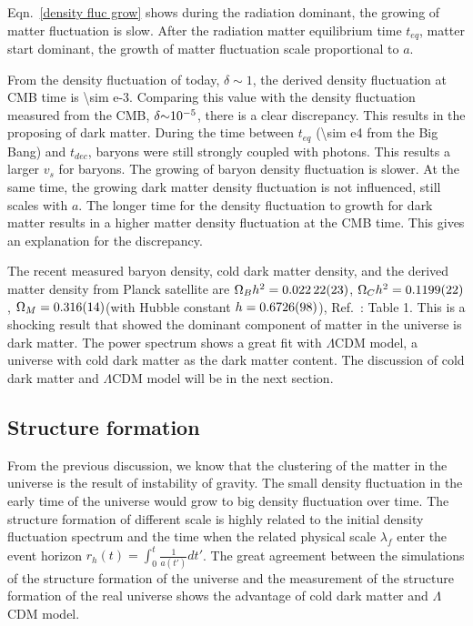 Eqn.~\ref{density fluc grow} shows during the radiation dominant, the growing of matter fluctuation is slow. After the radiation matter equilibrium time $t_{eq}$, matter start dominant, the growth of matter fluctuation scale proportional to $a$. 

From the density fluctuation of today, $\delta \sim 1$, the derived density fluctuation at CMB time is \num{\sim e-3}. Comparing this value with the density fluctuation measured from the CMB, $\delta \num{\sim e-5}$, there is a clear discrepancy. This results in the proposing of dark matter. During the time between $t_{eq}$ (\SI{\sim e4}{\yr} from the Big Bang) and $t_{dec}$, baryons were still strongly coupled with photons. This results a larger $v_s$ for baryons. The growing of baryon density fluctuation is slower. At the same time, the growing dark matter density fluctuation is not influenced, still scales with $a$. The longer time for the density fluctuation to growth for dark matter results in a higher matter density fluctuation at the CMB time. This gives an explanation for the discrepancy. 

The recent measured baryon density, cold dark matter density, and the derived matter density from Planck satellite are $\Omega_B h^2= \num[separate-uncertainty=false]{0.02222 \pm 0.00023}$, $\Omega_C h^2 = \num[separate-uncertainty=false]{0.1199 \pm 0.0022}$, $\Omega_M = \num[separate-uncertainty=false]{0.316 \pm 0.014}$(with Hubble constant $h = \num[separate-uncertainty=false]{0.6726 \pm 0.0098}$), Ref.~\cite{Ade2016}: Table 1. This is a shocking result that showed the dominant component of matter in the universe is dark matter. The power spectrum shows a great fit with $\Lambda$CDM model, a universe with cold dark matter as the dark matter content. The discussion of cold dark matter and $\Lambda$CDM model will be in the next section. 

\subsection{Structure formation}
From the previous discussion, we know that the clustering of the matter in the universe is the result of instability of gravity. The small density fluctuation in the early time of the universe would grow to big density fluctuation over time. The structure formation of different scale is highly related to the initial density fluctuation spectrum and the time when the related physical scale $\lambda_f$ enter the event horizon $r_h(t)=\int_0^t \frac{1}{a(t')} dt'$. The great agreement between the simulations of the structure formation of the universe and the measurement of the structure formation of the real universe shows the advantage of cold dark matter and $\Lambda$CDM model.


